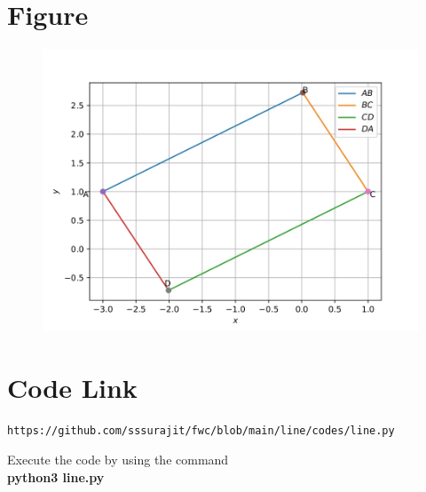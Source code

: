 \documentclass[journal,12pt,twocolumn]{IEEEtran}
\begin{document}
\section{\textbf{Figure}}
\begin{figure}[h]
    \centering
    \includegraphics[width=\columnwidth]{fig.jpg}
    \label{fig:my_label}
\end{figure}


\section{\textbf{Code Link}}

\begin{lstlisting}
https://github.com/sssurajit/fwc/blob/main/line/codes/line.py
\end{lstlisting}
Execute the code by using the command\\
\textbf{python3 line.py}
\end{document}
